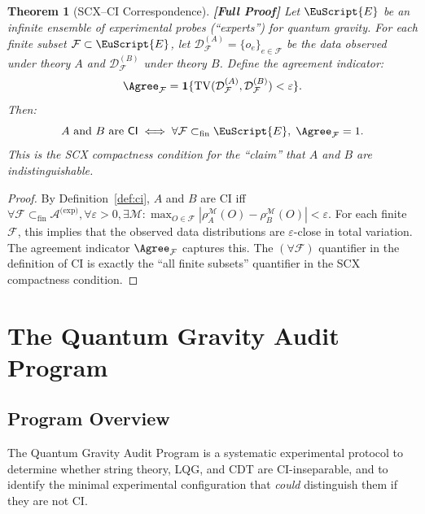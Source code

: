 \documentclass[12pt,a4paper]{article}
\newtheorem{theorem}{Theorem}[section]
\theoremstyle{remark}
\newcommand{\D}{\mathcal{D}}
\newcommand{\F}{\mathcal{F}}
\newcommand{\M}{\mathcal{M}}
\newcommand{\A}{\mathcal{A}}
\newcommand{\ExpertSet}{\EuScript{E}}
\newcommand{\CI}{\textsf{CI}}
\DeclareMathOperator{\TV}{TV}
\newcommand{\rigorFull}{\textbf{[Full Proof]}}
\begin{document}
\begin{theorem}[SCX--CI Correspondence]
\label{thm:scx_ci}
\rigorFull
Let $\ExpertSet$ be an infinite ensemble of experimental probes (``experts'') for quantum gravity. For each finite subset $\F \subset \ExpertSet$, let $\D_{\F}^{(A)} = \{o_e\}_{e \in \F}$ be the data observed under theory $A$ and $\D_{\F}^{(B)}$ under theory $B$. Define the agreement indicator:
\begin{equation}
  \Agree_{\F} = \mathbf{1}\{\TV(\D_{\F}^{(A)}, \D_{\F}^{(B)}) < \varepsilon\}.
\end{equation}
Then:
\begin{equation}
  \text{$A$ and $B$ are \CI} \iff \forall \F \subset_{\text{fin}} \ExpertSet,\; \Agree_{\F} = 1.
\end{equation}
This is the SCX compactness condition for the ``claim'' that $A$ and $B$ are indistinguishable.
\end{theorem}

\begin{proof}
By Definition~\ref{def:ci}, $A$ and $B$ are \CI{} iff $\forall \F \subset_{\text{fin}} \A^{\text{(exp)}}, \forall \varepsilon > 0, \exists \M: \max_{O \in \F} |\rho_A^{\M}(O) - \rho_B^{\M}(O)| < \varepsilon$. For each finite $\F$, this implies that the observed data distributions are $\varepsilon$-close in total variation. The agreement indicator $\Agree_{\F}$ captures this. The $(\forall \F)$ quantifier in the definition of \CI{} is exactly the ``all finite subsets'' quantifier in the SCX compactness condition.
\end{proof}


\section{The Quantum Gravity Audit Program}
\label{sec:program}

\subsection{Program Overview}

The Quantum Gravity Audit Program is a systematic experimental protocol to determine whether string theory, LQG, and CDT are \CI{}-inseparable, and to identify the minimal experimental configuration that \emph{could} distinguish them if they are not \CI{}.
\end{document}
